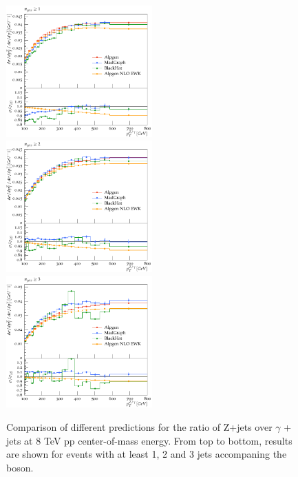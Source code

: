 \documentclass[11pt]{cernrep} \usepackage{graphicx,epsfig} 
\begin{document}
\begin{figure}
\begin{center}
\includegraphics[width=0.5\textwidth]{d07-x01-y01-mc.pdf} \\
\includegraphics[width=0.5\textwidth]{d08-x01-y01-mc.pdf} \\
\includegraphics[width=0.5\textwidth]{d08-x02-y01-mc.pdf}
 \caption{Comparison of different predictions for the ratio of Z+jets over $\gamma$ + jets at 8 TeV pp
   center-of-mass energy. From top to bottom, results are shown for events with at least 1, 2 and 3 jets accompaning the
   boson.}
\label{zgrmc}
\end{center}
\end{figure}
\end{document}

